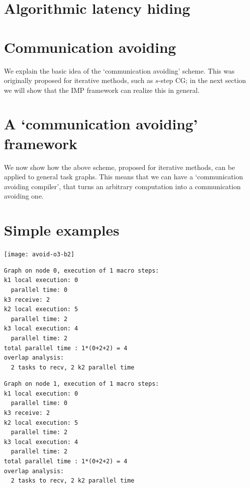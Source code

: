 \documentclass[11pt,fleqn,preprint]{impreport}
\begin{document}
\pagebreak

\section{Algorithmic latency hiding}


\section{Communication avoiding}

We explain the basic idea of the `communication avoiding' scheme. This
was originally proposed for iterative methods, such as $s$-step CG; in
the next section we will show that the IMP framework can realize this
in general.



\section{A `communication avoiding' framework}

We now show how the above scheme, proposed for iterative methods, can
be applied to general task graphs. This means that we can have a
`communication avoiding compiler', that turns an arbitrary computation
into a communication avoiding one.




\vfill\pagebreak
\section{Simple examples}

\texttt{[image: avoid-o3-b2]}

\begin{multicols}{2}
\begin{verbatim}
Graph on node 0, execution of 1 macro steps:
k1 local execution: 0
  parallel time: 0
k3 receive: 2
k2 local execution: 5
  parallel time: 2
k3 local execution: 4
  parallel time: 2
total parallel time : 1*(0+2+2) = 4
overlap analysis:
  2 tasks to recv, 2 k2 parallel time
\end{verbatim}
\vfill\columnbreak
\begin{verbatim}
Graph on node 1, execution of 1 macro steps:
k1 local execution: 0
  parallel time: 0
k3 receive: 2
k2 local execution: 5
  parallel time: 2
k3 local execution: 4
  parallel time: 2
total parallel time : 1*(0+2+2) = 4
overlap analysis:
  2 tasks to recv, 2 k2 parallel time
\end{verbatim}
\end{multicols}
\end{document}
